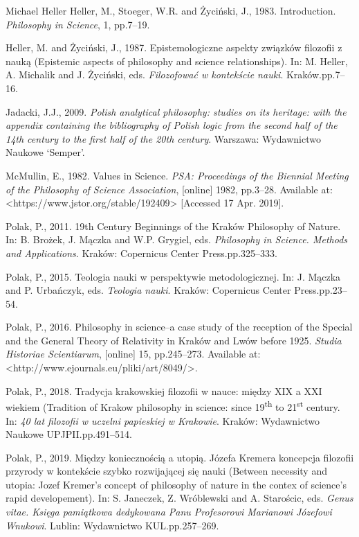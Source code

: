 \begin{artengenv}{Michael Heller}
Heller, M., Stoeger, W.R. and Życiński, J., 1983. Introduction. \textit{Philosophy in Science}, 1, pp.7–19.

Heller, M. and Życiński, J., 1987. Epistemologiczne aspekty związków filozofii z nauką (Epistemic aspects of philosophy
and science relationships). In: M. Heller, A. Michalik and J. Życiński, eds. \textit{Filozofować w kontekście nauki}.
Kraków.pp.7–16.

Jadacki, J.J., 2009. \textit{Polish analytical philosophy: studies on its heritage: with the appendix containing the
bibliography of Polish logic from the second half of the 14th century to the first half of the 20th century}. Warszawa:
Wydawnictwo Naukowe ‘Semper’.

McMullin, E., 1982. Values in Science. \textit{PSA: Proceedings of the Biennial Meeting of the Philosophy of Science
Association}, [online] 1982, pp.3–28. Available at: {\textless}https://www.jstor.org/stable/192409{\textgreater}
[Accessed 17 Apr. 2019].

Polak, P., 2011. 19th Century Beginnings of the Kraków Philosophy of Nature. In: B. Brożek, J. Mączka and W.P. Grygiel,
eds. \textit{Philosophy in Science. Methods and Applications}. Kraków: Copernicus Center Press.pp.325–333.

Polak, P., 2015. Teologia nauki w perspektywie metodologicznej. In: J. Mączka and P. Urbańczyk, eds. \textit{Teologia
nauki}. Kraków: Copernicus Center Press.pp.23–54.

Polak, P., 2016. Philosophy in science–a case study of the reception of the Special and the General Theory of Relativity
in Kraków and Lwów before 1925. \textit{Studia Historiae Scientiarum}, [online] 15, pp.245–273. Available at:
{\textless}http://www.ejournals.eu/pliki/art/8049/{\textgreater}.

Polak, P., 2018. Tradycja krakowskiej filozofii w nauce: między XIX a XXI wiekiem (Tradition of Krakow philosophy in
science: since 19\textsuperscript{th} to 21\textsuperscript{st}  century. In: \textit{40 lat filozofii w uczelni
papieskiej w Krakowie}. Kraków: Wydawnictwo Naukowe UPJPII.pp.491–514.

Polak, P., 2019. Między koniecznością a utopią. Józefa Kremera koncepcja filozofii przyrody w kontekście szybko
rozwijającej się nauki (Between necessity and utopia: Jozef Kremer’s concept of philosophy of nature in the contex of
science’s rapid developement). In: S. Janeczek, Z. Wróblewski and A. Starościc, eds. \textit{Genus vitae. Księga
pamiątkowa dedykowana Panu Profesorowi Marianowi Józefowi Wnukowi}. Lublin: Wydawnictwo KUL.pp.257–269.


\end{artengenv}
